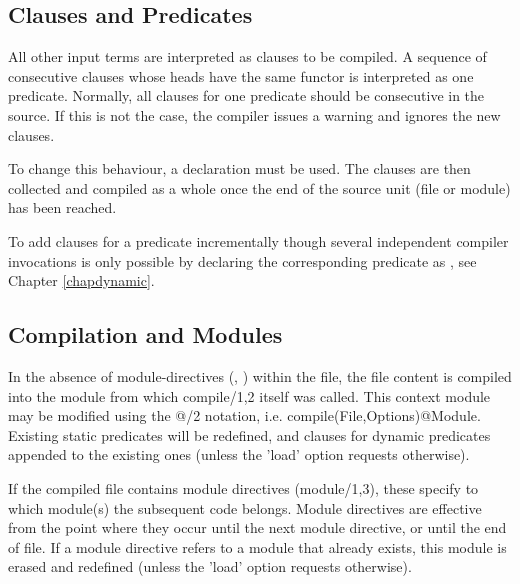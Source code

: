 \subsection{Clauses and Predicates}

All other input terms are interpreted as clauses to be compiled.
A sequence of consecutive clauses whose heads have the same
functor is interpreted as one predicate.  Normally, all clauses for
one predicate should be consecutive in the source.  If this is not the
case, the compiler issues a warning and ignores the new clauses.

To change this behaviour, a
declaration must be used.  The clauses are then collected and compiled
as a whole once the end of the source unit (file or module) has been reached.

To add clauses for a predicate incrementally though several independent
compiler invocations is only possible by declaring the corresponding
predicate as ,
see Chapter \ref{chapdynamic}.


\subsection{Compilation and Modules}

In the absence of module-directives
(,
)
within the file, the
file content is compiled into the module from which compile/1,2 itself
was called.  This context module may be modified using the @/2 notation,
i.e. compile(File,Options)@Module.  Existing static predicates will
be redefined, and clauses for dynamic predicates appended to the
existing ones (unless the 'load' option requests otherwise).

If the compiled file contains module directives (module/1,3), these
specify to which module(s) the subsequent code belongs.  Module directives
are effective from the point where they occur until the next module
directive, or until the end of file.  If a module directive refers
to a module that already exists, this module is erased and redefined
(unless the 'load' option requests otherwise).

